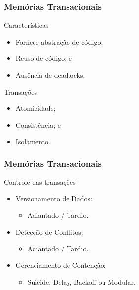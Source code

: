 \documentclass[10pt, pdf,xcolor=pdftex,dvipsnames,table]{beamer}
\begin{document}
\begin{frame} \frametitle{Memórias Transacionais}
    \begin{block}{Características}
        \begin{itemize}
        	\item Fornece abstração de código;
        	\item Reuso de código; e
        	\item Ausência de deadlocks.
        \end{itemize}
    \end{block}
    
    \begin{block}{Transações}
        \begin{itemize}
        	\item Atomicidade;
        	\item Consistência; e
        	\item Isolamento.
        \end{itemize}
    \end{block}
\end{frame}

\begin{frame} \frametitle{Memórias Transacionais}
    \begin{block}{Controle das transações}
        \begin{itemize}
    		\item Versionamento de Dados:
    		\begin{itemize}
    			\item Adiantado / Tardio.
    		\end{itemize}
    		\item Detecção de Conflitos:
    		\begin{itemize}
    			\item Adiantado / Tardio.
    		\end{itemize}
    		\item Gerenciamento de Contenção:
        		\begin{itemize}
        		    \item Suicide, Delay, Backoff ou Modular.
        		\end{itemize}
        \end{itemize}
    \end{block}
\end{frame}
\end{document}
